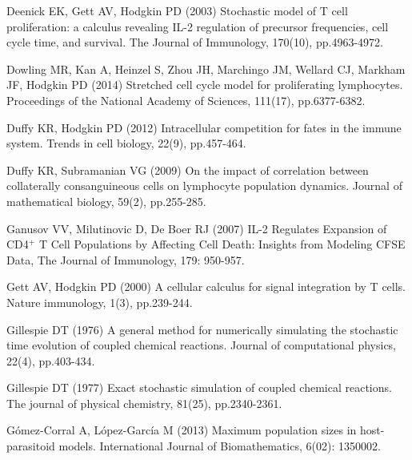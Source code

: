 \documentclass[10pt]{article}
\numberwithin{equation}{section}
\begin{document}
\begin{thebibliography}{}
Deenick EK, Gett AV, Hodgkin PD (2003) Stochastic model of T cell proliferation: a calculus revealing IL-2 regulation of precursor frequencies, cell cycle time, and survival. The Journal of Immunology, 170(10), pp.4963-4972.

Dowling MR, Kan A, Heinzel S, Zhou JH, Marchingo JM, Wellard CJ, Markham JF, Hodgkin PD (2014) Stretched cell cycle model for proliferating lymphocytes. Proceedings of the National Academy of Sciences, 111(17), pp.6377-6382.

Duffy KR, Hodgkin PD (2012) Intracellular competition for fates in the immune system. Trends in cell biology, 22(9), pp.457-464.

Duffy KR, Subramanian VG (2009) On the impact of correlation between collaterally consanguineous cells on lymphocyte population dynamics. Journal of mathematical biology, 59(2), pp.255-285.



Ganusov VV, Milutinovic D, De Boer RJ (2007) IL-2 Regulates Expansion of CD4$^+$ T Cell Populations by Affecting Cell Death: Insights from Modeling CFSE Data, The Journal of Immunology, 179: 950-957.

Gett AV, Hodgkin PD (2000) A cellular calculus for signal integration by T cells. Nature immunology, 1(3), pp.239-244.

Gillespie DT (1976) A general method for numerically simulating the stochastic time evolution of coupled chemical reactions. Journal of computational physics, 22(4), pp.403-434.

Gillespie DT (1977) Exact stochastic simulation of coupled chemical reactions. The journal of physical chemistry, 81(25), pp.2340-2361.

G\'omez-Corral A, L\'opez-Garc\'ia M (2013) Maximum population sizes in host-parasitoid models. International Journal of Biomathematics, 6(02): 1350002.


\end{thebibliography}
\end{document}
